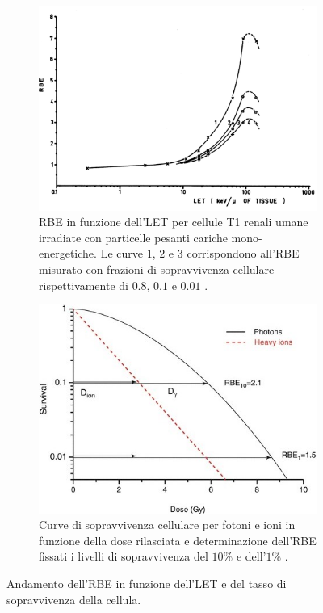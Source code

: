 \documentclass[12pt,a4paper,twoside]{report}
\begin{document}
	\begin{figure}[H]
		\centering
		\begin{subfigure}[t]{0.49\textwidth}
			\centering
 			\includegraphics[width=\textwidth, scale=0.5]{let_rbe1.png}
			\caption{RBE in funzione dell'LET per cellule T1 renali umane irradiate con particelle pesanti cariche mono-energetiche. Le curve $1$, $2$ e $3$ corrispondono all'RBE misurato con frazioni di sopravvivenza cellulare rispettivamente di $0.8$, $0.1$ e $0.01$ \cite{antib1020124}.}
			\label{fig:let_rbe}
		\end{subfigure}
		\hfill
		\begin{subfigure}[t]{0.49\textwidth}
			\centering
			\includegraphics[width=\textwidth, scale=0.5]{survival_dose.jpg}
			\caption{Curve di sopravvivenza cellulare per fotoni e ioni in funzione della dose rilasciata e determinazione dell'RBE fissati i livelli di sopravvivenza del $10\%$ e dell'$1\%$ \cite{rad_key}.}
			\label{fig:survival_dose}
		\end{subfigure}
		\caption{Andamento dell'RBE in funzione dell'LET e del tasso di sopravvivenza della cellula.}
	\end{figure}
\end{document}
